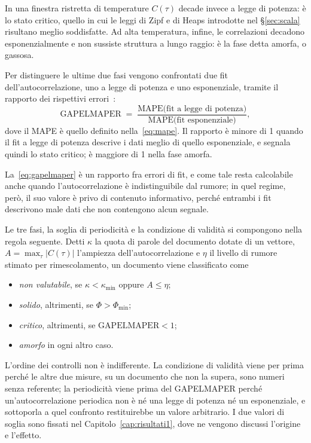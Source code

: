 In una finestra ristretta di temperature $C(\tau)$ decade invece a legge di
potenza: è lo stato critico, quello in cui le leggi di Zipf e di Heaps
introdotte nel §\ref{sec:scala} risultano meglio soddisfatte. Ad alta
temperatura, infine, le correlazioni decadono esponenzialmente e non sussiste
struttura a lungo raggio: è la fase detta amorfa, o gassosa.

Per distinguere le ultime due fasi vengono confrontati due fit
dell'autocorrelazione, uno a legge di potenza e uno esponenziale, tramite il
rapporto dei rispettivi errori~\cite{mikhaylovskiy2023}:
\begin{equation}
  \mathrm{GAPELMAPER} \;=\;
  \frac{\mathrm{MAPE}\bigl(\text{fit a legge di potenza}\bigr)}
       {\mathrm{MAPE}\bigl(\text{fit esponenziale}\bigr)},
  \label{eq:gapelmaper}
\end{equation}
dove il MAPE è quello definito nella~\eqref{eq:mape}. Il rapporto è minore di 1
quando il fit a legge di potenza descrive i dati meglio di quello esponenziale,
e segnala quindi lo stato critico; è maggiore di 1 nella fase amorfa.

La~\eqref{eq:gapelmaper} è un rapporto fra errori di fit, e come tale resta
calcolabile anche quando l'autocorrelazione è indistinguibile dal rumore; in
quel regime, però, il suo valore è privo di contenuto informativo, perché
entrambi i fit descrivono male dati che non contengono alcun segnale.

Le tre fasi, la soglia di periodicità e la condizione di validità si compongono
nella regola seguente. Detti $\kappa$ la quota di parole del documento dotate di
un vettore, $A = \max_\tau \lvert C(\tau)\rvert$ l'ampiezza
dell'autocorrelazione e $\eta$ il livello di rumore stimato per rimescolamento,
un documento viene classificato come
%
\begin{itemize}
  \item \emph{non valutabile}, se $\kappa < \kappa_{\min}$ oppure $A \le \eta$;
  \item \emph{solido}, altrimenti, se $\Phi > \Phi_{\min}$;
  \item \emph{critico}, altrimenti, se $\mathrm{GAPELMAPER} < 1$;
  \item \emph{amorfo} in ogni altro caso.
\end{itemize}
%
L'ordine dei controlli non è indifferente. La condizione di validità viene per
prima perché le altre due misure, su un documento che non la supera, sono numeri
senza referente; la periodicità viene prima del GAPELMAPER perché
un'autocorrelazione periodica non è né una legge di potenza né un esponenziale,
e sottoporla a quel confronto restituirebbe un valore arbitrario. I due valori
di soglia sono fissati nel Capitolo~\ref{cap:risultati1}, dove ne vengono
discussi l'origine e l'effetto.

